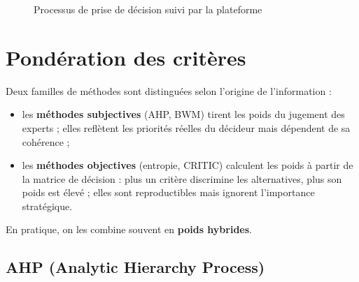 \documentclass[11pt,a4paper]{report}
\theoremstyle{definition}
\theoremstyle{remark}
\begin{document}
\begin{figure}[H]
\centering
{}
\caption{Processus de prise de décision suivi par la plateforme}\label{fig:processus}
\end{figure}

\chapter{Pondération des critères}\label{ch:ponderation}

Deux familles de méthodes sont distinguées selon l'origine de l'information :
\begin{itemize}
  \item les \textbf{méthodes subjectives} (AHP, BWM) tirent les poids du jugement des experts ; elles
        reflètent les priorités réelles du décideur mais dépendent de sa cohérence ;
  \item les \textbf{méthodes objectives} (entropie, CRITIC) calculent les poids à partir de la matrice de
        décision : plus un critère discrimine les alternatives, plus son poids est élevé ; elles sont
        reproductibles mais ignorent l'importance stratégique.
\end{itemize}
En pratique, on les combine souvent en \textbf{poids hybrides}.

\section{AHP (Analytic Hierarchy Process)}
\end{document}
